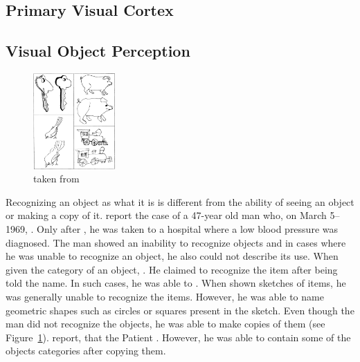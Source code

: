 \subsection{Primary Visual Cortex}\label{subsec:primary-visual-cortex}

\subsection{Visual Object Perception}\label{subsec:visual-object-perception}

\begin{figure}
    \begin{center}
        \includegraphics[width=0.28\textwidth]{images/rubens_sketches.jpg}
    \end{center}
    \caption[Copies of line drawings]{ taken from \citet{rubens1971associative}}
    \label{fig:copies_line_drawings}
\end{figure}
Recognizing an object as what it is is different from the ability of seeing an object or making a copy of it.
\citet{rubens1971associative} report the case of a 47-year old man who, on March 5--1969, .
Only after , he was taken to a hospital where a low blood pressure was diagnosed.
The man showed an inability to recognize objects and in cases where he was unable to recognize an object, he also could not describe its use.
When given the category of an object, .
He claimed to recognize the item after being told the name.
In such cases, he was able to .
When shown sketches of items, he was generally unable to recognize the items.
However, he was able to name geometric shapes such as circles or squares present in the sketch.
Even though the man did not recognize the objects, he was able to make copies of them (see Figure~\ref{fig:copies_line_drawings}).
\citet{rubens1971associative} report, that the Patient .
However, he was able to contain some of the objects categories after copying them.

